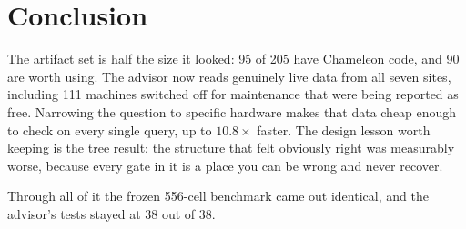 \documentclass[conference]{IEEEtran}
\begin{document}
\section{Conclusion}

The artifact set is half the size it looked: 95 of 205 have Chameleon code, and
90 are worth using. The advisor now reads genuinely live data from all seven
sites, including 111 machines switched off for maintenance that were being
reported as free. Narrowing the question to specific hardware makes that data
cheap enough to check on every single query, up to $10.8\times$ faster. The
design lesson worth keeping is the tree result: the structure that felt
obviously right was measurably worse, because every gate in it is a place you
can be wrong and never recover.

Through all of it the frozen 556-cell benchmark came out identical, and the
advisor's tests stayed at 38 out of 38.
\end{document}
